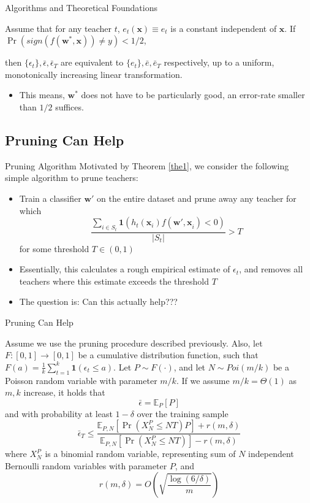 \documentclass[10pt,table,mathserif]{beamer}
\begin{document}
\begin{frame}{Algorithms and Theoretical Foundations}
  \begin{corollary}
    Assume that for any teacher $t$, \alert{$e_t(\mathbf{x})\equiv e_t$} is a constant independent of $\mathbf{x}$. If \alert{$\Pr (sign(f(\mathbf{w}^*, \mathbf{x}))\neq y) < 1/2$},

    then \alert{$\{\epsilon_t\}, \bar{\epsilon}, \bar{\epsilon}_T$} are equivalent to \alert{$\{ e_t \}, \bar{e}, \bar{e}_T$} respectively, up to a uniform, monotonically increasing linear transformation.
    \label{the2}
  \end{corollary}
  \pause
  \begin{itemize}
    \item This means, $\mathbf{w^*}$ does not have to be particularly good, an error-rate smaller than $1/2$ suffices.
  \end{itemize}
\end{frame}


\subsection{Pruning Can Help}

\begin{frame}{Pruning Algorithm}
Motivated by Theorem \ref{the1}, we consider the following simple algorithm to prune teachers: \pause
  \begin{itemize}
    \item Train a classifier $\mathbf{w}'$ on the entire dataset and prune away any teacher for which
      \[\frac{\sum_{i\in S_t}\mathbf{1}(h_t(\mathbf{x}_i)f(\mathbf{w',x}_i)<0)}{|S_t|} > T\]
      for some threshold $T \in (0,1)$ \pause
    \item Essentially, this calculates a rough empirical estimate of $\epsilon_t$, and removes all teachers where this estimate exceeds the threshold $T$ \pause
    \item The question is: Can this actually help???
  \end{itemize}
\end{frame}

\begin{frame}[shrink = 5]{Pruning Can Help}
  \begin{theorem}
    Assume we use the pruning procedure described previously. Also, let $F : [0, 1] \rightarrow [0,1]$ be a cumulative distribution function, such that $F(a) = \frac{1}{k}\sum^k_{t=1}\mathbf{1}(\epsilon_t \leq a)$. Let $P \sim F(\cdot)$, and let $N \sim Poi(m/k)$ be a Poisson random variable with parameter $m/k$. If we assume $m/k = \Theta(1)$ as $m, k$ increase, it holds that
    \[\bar{\epsilon} = \mathbb{E}_P[P]\] and with probability at least $1 - \delta$ over the training sample
    \[ \bar{\epsilon}_T \leq \frac{\mathbb{E}_{P,N}[\Pr (X^P_N \leq NT)P] + r(m, \delta)}{\mathbb{E}_{P,N}[\Pr (X^P_N \leq NT)] - r(m, \delta)}\]
    where $X^P_N$ is a binomial random variable, representing sum of $N$ independent Bernoulli random variables with parameter $P$, and
    \[r(m, \delta) = O \left(\sqrt{\frac{\log (6/\delta)}{m}}\right)\]
    \label{the3}
  \end{theorem}
\end{frame}
\end{document}
